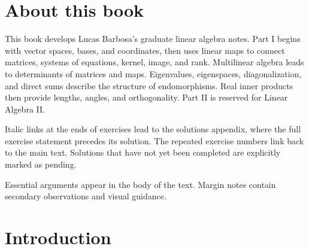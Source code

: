 \chapter*{About this book}

This book develops Lucas Barbosa's graduate linear algebra notes.
Part I begins with vector spaces, bases, and coordinates, then uses linear
maps to connect matrices, systems of equations, kernel, image, and rank.
Multilinear algebra leads to determinants of matrices and maps. Eigenvalues,
eigenspaces, diagonalization, and direct sums describe the structure of
endomorphisms. Real inner products then provide lengths, angles, and
orthogonality. Part II is reserved for Linear Algebra II.

Italic links at the ends of exercises lead to the solutions appendix,
where the full exercise statement precedes its solution. The repeated
exercise numbers link back to the main text. Solutions that have not yet
been completed are explicitly marked as pending.

Essential arguments appear in the body of the text. Margin notes contain secondary
observations and visual guidance.

\chapter*{Introduction}
\label{ch:introduction-to-linear-algebra}


